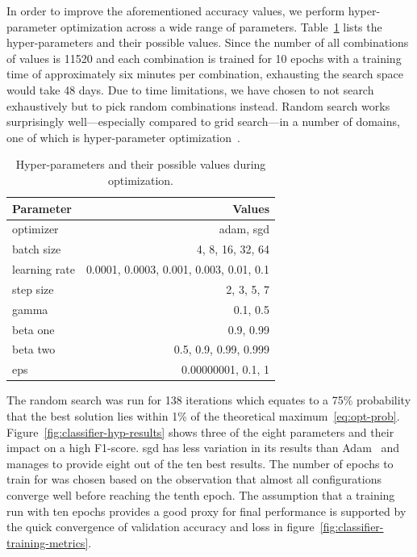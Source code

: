 \documentclass[draft,final]{vutinfth} %
\begin{document}
In order to improve the aforementioned accuracy values, we perform
hyper-parameter optimization across a wide range of
parameters. Table~\ref{tab:classifier-hyps} lists the hyper-parameters
and their possible values. Since the number of all combinations of
values is 11520 and each combination is trained for 10 epochs with a
training time of approximately six minutes per combination, exhausting
the search space would take 48 days. Due to time limitations, we have
chosen to not search exhaustively but to pick random combinations
instead. Random search works surprisingly well---especially compared to
grid search---in a number of domains, one of which is hyper-parameter
optimization~\cite{bergstra2012}.

\begin{table}[h]
  \centering
  \begin{tabular}{lr}
    \toprule
    Parameter &  Values \\
    \midrule
    optimizer &	adam, sgd \\
    batch size & 4, 8, 16, 32, 64 \\
    learning rate & 0.0001, 0.0003, 0.001, 0.003, 0.01, 0.1 \\
    step size & 2, 3, 5, 7 \\
    gamma & 0.1, 0.5 \\
    beta one & 0.9, 0.99 \\
    beta two & 0.5, 0.9, 0.99, 0.999 \\
    eps & 0.00000001, 0.1, 1 \\
    \bottomrule
  \end{tabular}
  \caption{Hyper-parameters and their possible values during
    optimization.}
  \label{tab:classifier-hyps}
\end{table}

The random search was run for 138 iterations which equates to a 75\%
probability that the best solution lies within 1\% of the theoretical
maximum~\eqref{eq:opt-prob}. Figure~\ref{fig:classifier-hyp-results}
shows three of the eight parameters and their impact on a high
F1-score. \gls{sgd} has less variation in its results than
Adam~\cite{kingma2017} and manages to provide eight out of the ten
best results. The number of epochs to train for was chosen based on
the observation that almost all configurations converge well before
reaching the tenth epoch. The assumption that a training run with ten
epochs provides a good proxy for final performance is supported by the
quick convergence of validation accuracy and loss in
figure~\ref{fig:classifier-training-metrics}.
\end{document}
